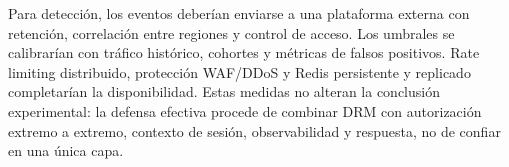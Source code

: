 Para detección, los eventos deberían enviarse a una plataforma externa con retención, correlación entre regiones y control de acceso. Los umbrales se calibrarían con tráfico histórico, cohortes y métricas de falsos positivos. Rate limiting distribuido, protección WAF/DDoS y Redis persistente y replicado completarían la disponibilidad. Estas medidas no alteran la conclusión experimental: la defensa efectiva procede de combinar DRM con autorización extremo a extremo, contexto de sesión, observabilidad y respuesta, no de confiar en una única capa.
